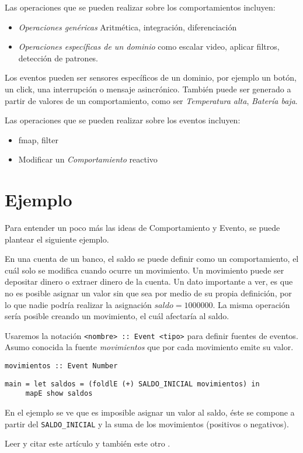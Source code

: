 Las operaciones que se pueden realizar sobre los comportamientos incluyen:
\begin{itemize}
\item \textit{Operaciones genéricas} Aritmética, integración, diferenciación
\item \textit{Operaciones específicas de un dominio} como escalar video, aplicar filtros, detección de patrones.
\end{itemize}

Los eventos pueden ser sensores específicos de un dominio, por ejemplo un
botón, un click, una interrupción o mensaje asincrónico.
También puede ser generado a partir de valores de un comportamiento,
como ser \emph{Temperatura alta}, \emph{Batería baja}.

Las operaciones que se pueden realizar sobre los eventos incluyen:
\begin{itemize}
\item fmap, filter
\item Modificar un \emph{Comportamiento} reactivo
\end{itemize}


\section{Ejemplo}

Para entender un poco más las ideas de Comportamiento y Evento, se puede
plantear el siguiente ejemplo.

  En una cuenta de un banco, el saldo se puede definir
como un comportamiento, el cuál solo se modifica cuando ocurre
un movimiento.
  Un movimiento puede ser depositar dinero o extraer
dinero de la cuenta.
  Un dato importante a ver, es que no es posible asignar un valor
sin que sea por medio de su propia definición, por lo que nadie
podría realizar la asignación $saldo = 1000000$.
  La misma operación sería posible creando un movimiento, el cuál
afectaría al saldo.

  Usaremos la notación \texttt{<nombre> :: Event <tipo>} para definir
fuentes de eventos.
  Asumo conocida la fuente \emph{movimientos} que por cada movimiento
emite su valor.

\begin{verbatim}
movimientos :: Event Number
\end{verbatim}

\begin{verbatim}
main = let saldos = (foldlE (+) SALDO_INICIAL movimientos) in
     mapE show saldos
\end{verbatim}

  En el ejemplo se ve que es imposible asignar un valor al saldo,
éste se compone a partir del \texttt{SALDO\_INICIAL} y la suma de
los movimientos (positivos o negativos).

Leer y citar este artículo \cite{peterson99:lambdainmotion} y también este otro
\cite{evanczaplicki2012:Elm}.



